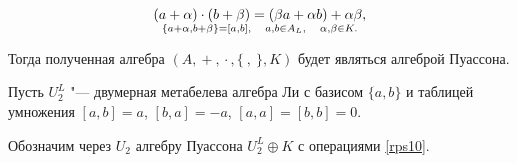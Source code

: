 \begin{equation}

\label{rps10}

(a+\alpha) \cdot (b+\beta) = (\beta a + \alpha b) + \alpha \beta, \atop

\{a+\alpha, b+\beta \} = [a,b], \quad a,b \in A_L, \quad \alpha,\beta \in K.

\end{equation}

Тогда полученная алгебра $(A, {}+{}, {}\cdot{} ,\{~,~\}, K)$ будет являться алгеброй Пуассона.



Пусть $U^L_2$ "--- двумерная метабелева алгебра Ли с базисом $\{a, b\}$ и таблицей умножения $[a,b] = a$, $[b,a]=-a$, $[a,a]=[b,b]=0$. 

Обозначим через $U_2$  алгебру Пуассона $U^L_2 \oplus K$ с операциями \eqref{rps10}.







\smallskip



